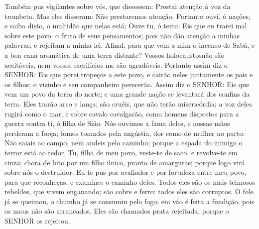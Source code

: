 {Também pus vigilantes sobre vós, que dissessem: Prestai atenção à voz da trombeta. Mas eles disseram: Não prestaremos atenção.
Portanto ouvi, ó nações, e saiba disto, o multidão que nelas está;
Ouve tu, ó terra: Eis que eu trarei mal sobre este povo: o fruto de seus pensamentos; pois não dão atenção a minhas palavras, e rejeitam a minha lei.
Afinal, para que vem a mim o incenso de Sabá, e a boa cana aromática de uma terra distante? Vossos holocaustosnão
{} são aceitáveis, nem vossos sacrifícios me são agradáveis.
Portanto assim diz o SENHOR: Eis que porei tropeços a este povo, e cairão neles juntamente os pais e os filhos; o vizinho e seu companheiro perecerão.
Assim diz o SENHOR: Eis que vem um povo da terra do norte; e uma grande nação se levantará dos confins da terra.
Eles trarão arco e lança; são cruéis, que não terão misericórdia; a voz deles rugirá como o mar, e sobre cavalo cavalgarão, como homens dispostos para a guerra contra ti, ó filha de Sião.
Nós ouvimos a fama deles, e nossas mãos perderam a força; fomos tomados pela angústia,
{} dor como de mulher no parto.
Não saiais ao campo, nem andeis pelo caminho; porque a espada do inimigo
{} o terror está ao redor.
Tu, filha de meu povo, veste-te de saco, e revolve-te em cinza; chora de luto
{} por um filho único, pranto de amarguras; porque logo virá sobre nós o destruidor.
Eu te pus por avaliador
 e por fortaleza entre meu povo, para que reconheças, e examines o caminho deles.
Todos eles são os mais teimosos rebeldes, que vivem enganando; são
{} cobre e ferro: todos eles são corruptos.
O fole já se queimou, o chumbo já se consumiu pelo fogo; em vão é feita a fundição, pois os maus não são arrancados.
Eles são chamados prata rejeitada, porque o SENHOR os rejeitou.

\par }

